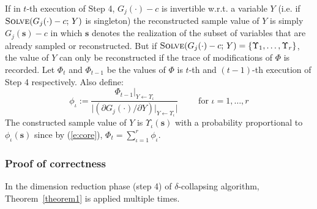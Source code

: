 \documentclass[]{article}
\newcommand{\bvec}[1]{\textbf{#1}}
\begin{document}
If in $t$-th execution of Step 4, 
{\footnotesize$G_j(\cdot) - c$} is invertible w.r.t. a variable $Y$ 
(i.e. if 
{\footnotesize$\textsc{Solve}(G_j(\cdot)-c ;\, Y)$} 
is singleton)
the reconstructed sample value of $Y$ is simply 
{\footnotesize$G_j(\bvec{s}) - c$} 
in which $\bvec{s}$ denotes the realization of the subset of variables that are already sampled or reconstructed. 
But if 
{\footnotesize$\textsc{Solve}(G_j(\cdot)-c ;\, Y) =  \{\Upsilon_1, \ldots, \Upsilon_r \}$},
the value of $Y$ can only be reconstructed if the trace of modifications of $\Phi$ is recorded.
Let $\Phi_t$ and $\Phi_{t-1}$ be the values of $\Phi$ is $t$-th and $(t-1)$-th execution of Step 4 respectively. Also define:
$$
\phi_\iota := 
\frac{\Phi_{t - 1}|_{Y \leftarrow \Upsilon_\iota}}{
\big|(\partial G_j(\cdot) / \partial Y) |_{Y \leftarrow \Upsilon_\iota}
\big|
}
\qquad \text{ for } \iota = 1, \ldots, r
$$ 
The constructed sample value of $Y$ is 
$\Upsilon_\iota(\bvec{s})$ with a probability proportional to $\phi_\iota(\bvec{s})$ 
since by (\ref{e:core}), $\Phi_t = \sum_{\iota=1}^{r} \phi_{\iota}$.



\subsubsection{Proof of correctness}

In the dimension reduction phase (step 4) of $\delta$-collapsing algorithm, Theorem~\ref{theorem1} is applied multiple times. 
\end{document}
